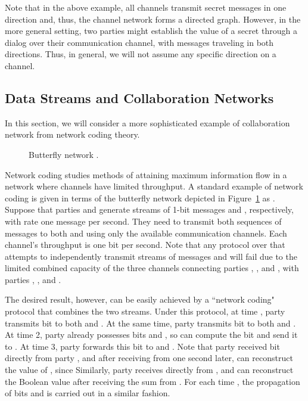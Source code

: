 \documentclass{llncs}
\begin{document}
Note that in the above example, all channels transmit secret messages in one direction and, thus, the channel network forms a directed graph. However, in the more general setting, two parties might establish the value of a secret through a dialog over their communication channel, with messages traveling in both directions. Thus, in general, we will not assume any specific direction on a channel.



  





\subsection{Data Streams and Collaboration Networks}
In this section, we will consider a more sophisticated example of collaboration network from network coding theory.

\begin{figure}[htbp]
   \centering
   \caption{Butterfly network .}
   \label{butterfly_graph}
\end{figure}


Network coding studies methods of attaining maximum information flow in a network where channels have limited throughput. 
A standard example of network coding is given in terms of the butterfly network \cite{acly00} depicted in Figure~\ref{butterfly_graph} as . Suppose that parties  and  generate streams of 1-bit messages  and , respectively, with rate one message per second. They need to transmit both sequences of messages to both  and  using only the available communication channels. Each channel's throughput is one bit per second. Note that any protocol over  that attempts to independently transmit streams of messages  and  will fail due to the limited combined capacity of the three channels connecting parties , , and , with parties , , and .  



The desired result, however, can be easily achieved by a ``network coding" protocol that combines the two streams. 
Under this protocol, at time , party  transmits bit  to both  and . At the same time, party  transmits bit  to both  and . At time 2, party  already possesses bits  and , so can compute the bit  and send it to . At time 3, party  forwards this bit to  and . Note that party  received bit  directly from party , and after receiving  from  one second later,  can reconstruct the value of , since 
 Similarly, party  receives  directly from , and can reconstruct the Boolean value  after receiving the sum from .  For each time , the propagation of bits  and  is carried out in a similar fashion.
\end{document}
